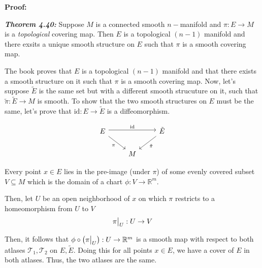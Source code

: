 \documentclass{article}
\newcommand{\R}{\mathbb{R}}
\newcommand{\restr}[2]{{%
  \left.\kern-\nulldelimiterspace %
  #1 %
  \vphantom{\big|} %
  \right|_{#2} %
  }}
\begin{document}
\vskip 0.5cm
\textbf{Proof:}

\begin{dottedbox}
  \emph{\textbf{Theorem 4.40:}} Suppose $M$ is a connected smooth $n-$manifold and $\pi : E \rightarrow M$ is a \emph{topological} covering map. Then $E$ is a topological $(n-1)$ manifold and there exsits a unique smooth structure on $E$ such that $\pi$ is a smooth covering map.
\end{dottedbox}

\vskip 0.5cm
The book proves that $E$ is a topological $(n-1)$ manifold and that there exists a smooth structure on it such that $\pi$ is a smooth covering map. Now, let's suppose $\tilde{E}$ is the same set but with a different smooth strucuture on it, such that $\tilde{\pi} : \tilde{E} \rightarrow M$ is smooth. To show that the two smooth structures on $E$ must be the same, let's prove that $\mathrm{id} : E \rightarrow \tilde{E}$ is a diffeomorphism.

\[\begin{tikzcd}
	E && {\tilde{E}} \\
	& M
	\arrow["{\mathrm{id}}", shift left, from=1-1, to=1-3]
	\arrow["{\tilde{\pi}}", from=1-3, to=2-2]
	\arrow["\pi"', from=1-1, to=2-2]
\end{tikzcd}\]



\vskip 0.5cm
Every point $x \in E$ lies in the pre-image (under $\pi$) of some evenly covered subset $V \subseteq M$ which is the domain of a chart $\phi : V \rightarrow \R^m$. 

\vskip 0.25cm
Then, let $U$ be an open neighborhood of $x$ on which $\pi$ restricts to a homeomorphism from $U$ to $V$
\[ \restr{\pi}{U} : U \rightarrow V  \]

\vskip 0.25cm
Then, it follows that $\phi \circ \left(\restr{\pi}{U}\right) : U \rightarrow \R^m$ is a smooth map with respect to both atlases $\mathcal{T}_1, \mathcal{T}_2$ on $E, \tilde{E}$. Doing this for all points $x \in E$, we have a cover of $E$ in both atlases. Thus, the two atlases are the same.
\end{document}
